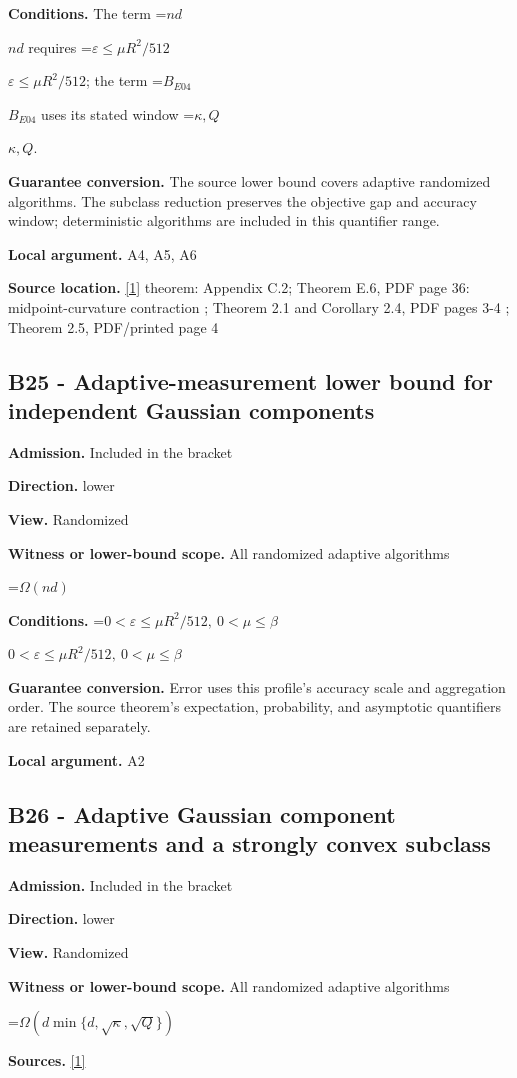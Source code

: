 \documentclass[10pt,a4paper]{article}
\newcommand{\AtlasMath}[1]{\par\begingroup\centering\setbox0=\hbox{$\displaystyle #1$}\ifdim\wd0>1.4\linewidth\typeout{ATLAS WIDE FORMULA: \the\wd0}\fi\ifdim\wd0>\linewidth\resizebox{\linewidth}{!}{\box0}\else\box0\fi\par\endgroup}
\newcommand{\AtlasInlineMath}[1]{\begingroup\setbox0=\hbox{$#1$}\ifdim\wd0>.4\linewidth\endgroup\AtlasMath{#1}\else\endgroup$#1$\fi}
\begin{document}
\textbf{Conditions.} The term \AtlasInlineMath{nd} requires \AtlasInlineMath{\varepsilon\le\mu R^2/512}; the term \AtlasInlineMath{B_{E04}} uses its stated window \AtlasInlineMath{\kappa,Q}.

\textbf{Guarantee conversion.} The source lower bound covers adaptive randomized algorithms. The subclass reduction preserves the objective gap and accuracy window; deterministic algorithms are included in this quantifier range.

\textbf{Local argument.} A4, A5, A6

\textbf{Source location.} \href{https://arxiv.org/html/2610.00345v1}{[1]} theorem: Appendix C.2; Theorem E.6, PDF page 36: midpoint-curvature contraction ; Theorem 2.1 and Corollary 2.4, PDF pages 3-4 ; Theorem 2.5, PDF/printed page 4

\subsection{B25 - Adaptive-measurement lower bound for independent Gaussian components}
\textbf{Admission.} Included in the bracket

\textbf{Direction.} lower

\textbf{View.} Randomized

\textbf{Witness or lower-bound scope.} All randomized adaptive algorithms

\AtlasMath{\Omega(nd)}
\textbf{Conditions.} \AtlasInlineMath{0<\varepsilon\le\mu R^2/512,\ 0<\mu\le\beta}

\textbf{Guarantee conversion.} Error uses this profile's accuracy scale and aggregation order. The source theorem's expectation, probability, and asymptotic quantifiers are retained separately.

\textbf{Local argument.} A2

\subsection{B26 - Adaptive Gaussian component measurements and a strongly convex subclass}
\textbf{Admission.} Included in the bracket

\textbf{Direction.} lower

\textbf{View.} Randomized

\textbf{Witness or lower-bound scope.} All randomized adaptive algorithms

\AtlasMath{\Omega(d\min\{d,\sqrt\kappa,\sqrt Q\})}
\textbf{Sources.} \href{https://arxiv.org/html/2610.00345v1}{[1]}
\end{document}
